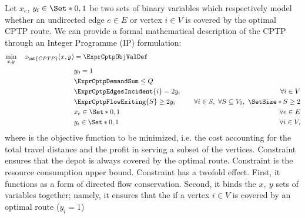 Let $x_{e}$, $y_{i} \in \Set*{0, 1}$ be two sets of binary variables which respectively
model whether an undirected edge $e \in E$ or vertex $i \in V$ is covered by the optimal CPTP route.
We can provide a formal mathematical description of the CPTP through an Integer Programme (IP) formulation:
\begin{align}
	\min_{x,y} \quad z_\mt{CPTP}(x, y) & = \ExprCptpObjValDef                     & \label{eq:cptp-obj-function}                                                                          \\
	                                   & y_0 = 1                                  & \label{eq:cptp-depot-part-of-tour-constraint}                                                         \\
	                                   & \ExprCptpDemandSum  \le Q                & \label{eq:cptp-resource-upper-bound-constraint}                                                       \\
	                                   & \ExprCptpEdgesIncident{i}  = 2 y_i       & \quad \forall i \in V         \label{eq:cptp-flow-conservation-constraint}                            \\
	                                   & \ExprCptpFlowExiting{S} \ge 2 y_{i}      & \quad \forall i \in S,\ \forall S \subseteq V_0,\ \SetSize*{S} \ge 2 \label{eq:cptp-gsec-constraints} \\
	                                   & x_{e}                   \in \Set*{0, 1}  & \quad \forall e \in E               \label{eq:cptp-x-mip-var-bounds}                                  \\
	                                   & y_{i}                    \in \Set*{0, 1} & \quad \forall i \in V             \label{eq:cptp-y-mip-var-bounds},
\end{align}
where  is the objective function to be minimized, i.e. the cost
accounting for the total travel distance and the profit in serving a subset of the vertices.
Constraint  ensures that the depot is always covered by the optimal route.
Constraint  is the resource consumption upper bound.
Constraint  has a twofold effect.
First, it functions as a form of directed flow conservation.
Second, it binds the $x,\ y$ sets of variables together;
namely, it ensures that the if a vertex $i \in V$ is covered by an optimal route ($y_i = 1$)
